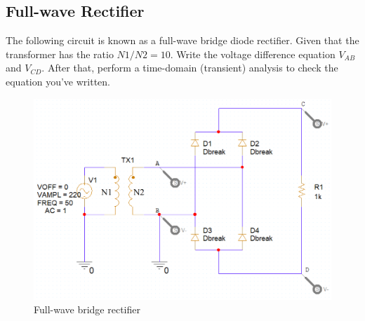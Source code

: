 \subsection{Full-wave Rectifier}
The following circuit is known as a full-wave bridge diode rectifier. Given that the transformer has the ratio $N1/N2 = 10$. Write the voltage difference equation $V_{AB}$ and $V_{CD}$. After that, perform a time-domain (transient) analysis to check the equation you've written.

\begin{figure}[H]
    \centering
    \includegraphics[width=5in]{source/picture/bai_2/LAB2_EX4_de.png}
    \caption{Full-wave bridge rectifier}
    \label{lab2_ex4_de}
\end{figure}

